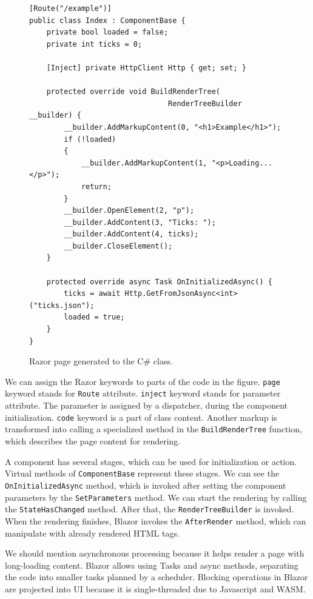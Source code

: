 \begin{figure}[t]
\begin{lstlisting}
[Route("/example")]
public class Index : ComponentBase {
    private bool loaded = false;
    private int ticks = 0;
	
    [Inject] private HttpClient Http { get; set; }

    protected override void BuildRenderTree(
    							RenderTreeBuilder __builder) {
        __builder.AddMarkupContent(0, "<h1>Example</h1>");
        if (!loaded)
        {
            __builder.AddMarkupContent(1, "<p>Loading...</p>");
            return;
        }
        __builder.OpenElement(2, "p");
        __builder.AddContent(3, "Ticks: ");
        __builder.AddContent(4, ticks);
        __builder.CloseElement();
    }

    protected override async Task OnInitializedAsync() {
        ticks = await Http.GetFromJsonAsync<int>("ticks.json");
        loaded = true;
    }
}
\end{lstlisting}
\caption{Razor page generated to the C\# class.}
\label{img06:component}
\end{figure}
\par
We can assign the Razor keywords to parts of the code in the figure.
\texttt{page} keyword stands for \texttt{Route} attribute.
\texttt{inject} keyword stands for parameter attribute. 
The parameter is assigned by a dispatcher, during the component initialization.
\texttt{code} keyword is a part of class content.
Another markup is transformed into calling a specialized method in the \texttt{BuildRenderTree} function, which describes the page content for rendering.
\par
A component has several stages, which can be used for initialization or action.
Virtual methods of \texttt{ComponentBase} represent these stages.
We can see the \texttt{OnInitializedAsync} method, which is invoked after setting the component parameters by the \texttt{SetParameters} method.
We can start the rendering by calling the \texttt{StateHasChanged} method.
After that, the \texttt{RenderTreeBuilder} is invoked.
When the rendering finishes, Blazor invokes the \texttt{AfterRender} method, which can manipulate with already rendered HTML tags.
\par
We should mention asynchronous processing because it helps render a page with long-loading content.
Blazor allows using Tasks and async methods, separating the code into smaller tasks planned by a scheduler.
Blocking operations in Blazor are projected into UI because it is single-threaded due to Javascript and WASM.
